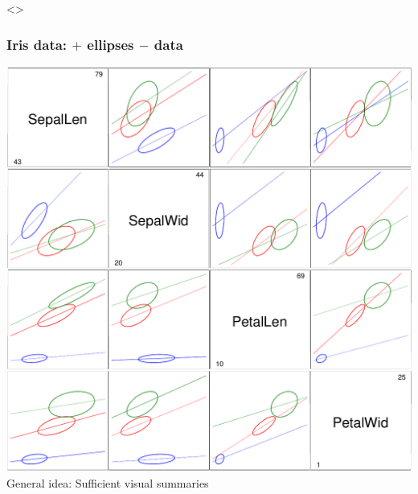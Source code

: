 \begin{frame}<\inlong>
  \frametitle{Iris data: \scatmat $+$  ellipses $-$ data}
  \begin{center}
  \includegraphics[height=.8\textheight,clip]{fig/scatirisd3}
  \\ General idea: Sufficient visual summaries
  \end{center}
\end{frame}

